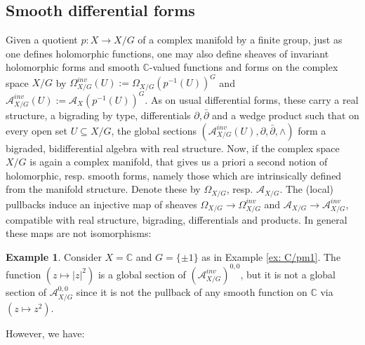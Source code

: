 \documentclass[12pt,reqno]{amsart}
\theoremstyle{definition}
\newtheorem{ex}[thm]{Example}
\newcommand{\C}{\mathbb{C}}
\newcommand{\cA}{\mathcal{A}}
\newcommand{\del}{\partial}
\newcommand{\delbar}{\bar{\del}}
\begin{document}
\subsection{Smooth differential forms}
Given a quotient $p:X\to X/G$ of a complex manifold by a finite group, just as one defines holomorphic functions, one may also define sheaves of invariant holomorphic forms and smooth $\C$-valued functions and forms on the complex space $X/G$ by $\Omega_{X/G}^{inv}(U):=\Omega_{X/G}(p^{-1}(U))^G$ and $\cA_{X/G}^{inv}(U):=\cA_X(p^{-1}(U))^G$. As on usual differential forms, these carry a real structure, a bigrading by type, differentials $\del,\delbar$ and a wedge product such that on every open set $U\subseteq X/G$, the global sections $(\cA_{X/G}^{inv}(U),\del,\delbar,\wedge)$ form a bigraded, bidifferential algebra with real structure. Now, if the complex space $X/G$ is again a complex manifold, that gives us a priori a second notion of holomorphic, resp. smooth forms, namely those which are intrinsically defined from the manifold structure. Denote these by $\Omega_{X/G}$, resp. $\cA_{X/G}$. The (local) pullbacks induce an injective map of sheaves $\Omega_{X/G}\to \Omega_{X/G}^{inv}$ and $\cA_{X/G}\to \cA_{X/G}^{inv}$, compatible with real structure, bigrading, differentials and products. In general these maps are not isomorphisms:

\begin{ex}
Consider $X=\C$ and $G=\{\pm 1\}$ as in Example \ref{ex: C/pm1}. The function $(z\mapsto|z|^2)$ is a global section of $(\cA_{X/G}^{inv})^{0,0}$, but it is not a global section of $\cA_{X/G}^{0,0}$ since it is not the pullback of any smooth function on $\C$ via $(z\mapsto z^2)$.
\end{ex}

However, we have:
\end{document}
